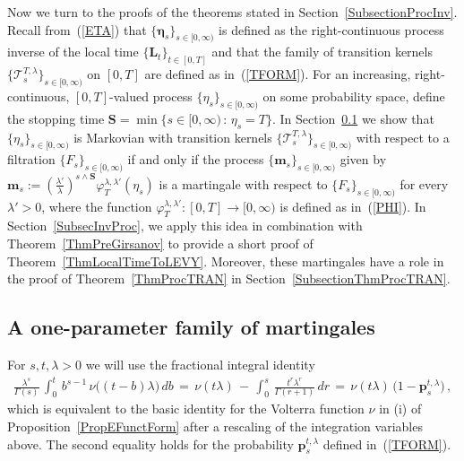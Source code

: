\documentclass[10pt]{article}
\numberwithin{equation}{section}
\theoremstyle{definition}
\begin{document}
Now we turn to the proofs of the theorems stated in Section~\ref{SubsectionProcInv}.  Recall from~(\ref{ETA}) that $\{\boldsymbol{\eta}_s\}_{s\in [0,\infty)}$ is defined as the right-continuous process inverse of the local time  $\{\mathbf{L}_t\}_{t\in [0,T]}$ and that the family of transition kernels $\{ \mathscr{T}^{T,\lambda}_s\}_{s\in [0,\infty)} $  on $[0,T]$ are defined as in~(\ref{TFORM}).
For an increasing, right-continuous,  $[0,T]$-valued process $\{ \eta_s \}_{s\in [0,\infty)}$ on some probability space,  define the stopping time $\mathbf{S}=\min\{s\in [0,\infty)\,: \,  \eta_s=T \}  $.  In Section~\ref{SubsectionDetMart} we show that 
  $\{ \eta_s \}_{s\in [0,\infty)}$  is Markovian with transition kernels $\{ \mathscr{T}^{T,\lambda}_s \}_{s\in [0,\infty)}   $  with respect to a filtration $\{ F_s\}_{s\in [0,\infty)}$ if and only if the  process $\{ \mathbf{m}_s \}_{s\in [0,\infty)  }$ given by $\mathbf{m}_s:=(\frac{\lambda'}{\lambda})^{s\wedge \mathbf{S}} \varphi_T^{\lambda,\lambda'}( \eta_s)$ is a martingale with respect to $\{ F_s\}_{s\in [0,\infty)}$ for every $\lambda'>0$, where the function $\varphi_T^{\lambda,\lambda'}:[0,T]\rightarrow [0,\infty) $ is defined as in~(\ref{PHI}).
  In Section~\ref{SubsecInvProc}, we apply this idea in combination with Theorem~\ref{ThmPreGirsanov}   to provide a short proof of   Theorem~\ref{ThmLocalTimeToLEVY}.  Moreover, these martingales  have a role in the proof of Theorem~\ref{ThmProcTRAN}   in
 Section~\ref{SubsectionThmProcTRAN}.


\subsection{A one-parameter family of martingales}\label{SubsectionDetMart}









For  $s,t,\lambda>0$  we will use the fractional integral identity
\begin{align} \label{RemarkConv}
\frac{ \lambda^s }{  \Gamma(s)} \,\int_0^t\, b^{s-1}\,\nu\big( (t-b)\lambda \big)\,  db\,=\,\nu(t\lambda  ) \,-\,\int_0^{s}\,\frac{ t^r\lambda^r  }{ \Gamma(r+1)  } \, dr\,=\, \nu(t\lambda  )\,\big(1-\mathbf{p}_s^{t,\lambda}\big) \,, 
\end{align}
which is equivalent to the basic identity for the Volterra function $\nu$ in (i) of  Proposition~\ref{PropEFunctForm} after a rescaling of the integration variables above.  The second equality holds for the probability $\mathbf{p}_s^{t,\lambda}$ defined in~(\ref{TFORM}).
\end{document}
